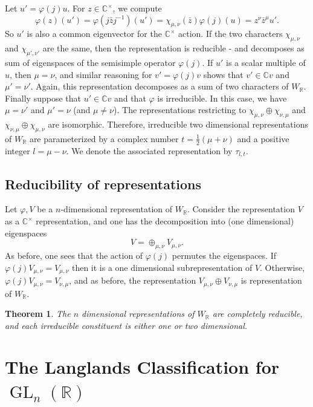 \documentclass{amsart}
\numberwithin{equation}{section}
\theoremstyle{plain}
\newtheorem{theorem}{Theorem}[section]
\theoremstyle{definition}
\theoremstyle{remark}
\newcommand{\osum}{\oplus}
\renewcommand{\_}[2]{\underbrace{#1}_{#2}}
\renewcommand{\^}[2]{\overbrace{#1}_{#2}}
\newcommand{\R}{\mathbb{R}}
\newcommand{\C}{\mathbb{C}}
\newcommand{\GL}{\operatorname{GL}}
\begin{document}
Let $u' = \varphi(j) u$. For $z\in \C^\times$, we compute \[\varphi(z)(u') = \varphi(j\bar z j^{-1})(u') = \chi_{\mu, \nu}(\bar z)\varphi(j)(u)=z^\nu \bar z^\mu u'.\] So $u'$ is also a common eigenvector for the $\C^\times$ action. If the two characters $\chi_{\mu,\nu}$ and $\chi_{\mu',\nu'}$ are the same, then the representation is reducible - and decomposes as sum of eigenspaces of the semisimple operator $\varphi(j)$.
If $u'$ is a scalar multiple of $u$, then $\mu = \nu$, and similar reasoning for $v' = \varphi(j) v$ shows that $v' \in \C v$ and $\mu' = \nu'$. Again, this representation decomposes as a sum of two characters of $W_\R$.\\

Finally suppose that $u' \in \C v$ and that $\varphi$ is irreducible. In this case, we have $\mu = \nu'$ and $\mu' = \nu$ (and $\mu \neq \nu$). The representations restricting to $\chi_{\mu,\nu} \osum \chi_{\nu,\mu}$ and $\chi_{\nu,\mu}\osum \chi_{\mu,\nu}$ are isomorphic. Therefore, irreducible two dimensional representations of $W_\R$ are parameterized by a complex number $t = \frac12 \left(\mu +\nu\right)$ and a positive integer $l = \mu - \nu$. We denote the associated representation by $\tau_{l,t}$.

\subsection{Reducibility of representations}
Let $\varphi, V$ be a $n$-dimensional representation of $W_\R$. Consider the representation $V$ as a $\C^\times$ representation, and one has the decomposition into (one dimensional) eigenspaces \[V = \osum_{\mu,\nu} V_{\mu,\nu}.\] As before, one sees that the action of $\varphi(j)$ permutes the eigenspaces. If $\varphi(j)V_{\mu,\nu} = V_{\mu,\nu}$ then it is a one dimensional subrepresentation of $V$. Otherwise, $\varphi(j)V_{\mu,\nu} = V_{\nu,\mu}$, and as before, the representation $V_{\mu,\nu} \osum V_{\nu,\mu}$ is representation of $W_\R$.\\

\begin{theorem}
  The $n$ dimensional representations of $W_\R$ are completely reducible, and each irreducible constituent is either one or two dimensional.
\end{theorem}

\section{The Langlands Classification for $\GL_n(\R)$}
\end{document}
